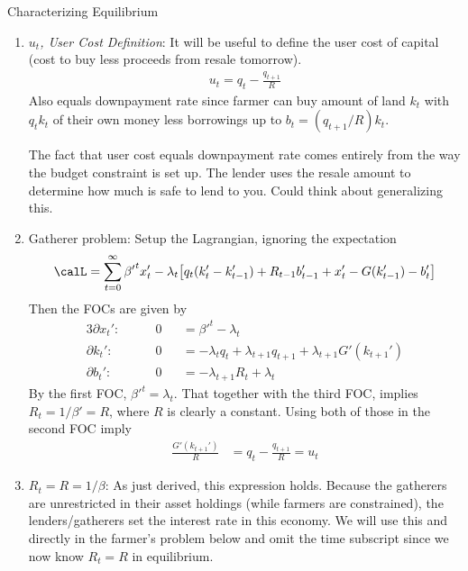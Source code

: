 \documentclass[12pt]{article}
\theoremstyle{plain}
\theoremstyle{definition}
\theoremstyle{remark}
\begin{document}
\clearpage
Characterizing Equilibrium
\begin{enumerate}
  \item
    \emph{$u_t$, User Cost Definition}:
    It will be useful to define the user cost of capital (cost to buy
    less proceeds from resale tomorrow).
    \begin{align*}
      u_t = q_t - \frac{q_{t+1}}{R}
    \end{align*}
     Also equals downpayment rate since farmer can buy amount of land
     $k_{t}$ with $q_{t}k_t$ of their own money less borrowings up to
     $b_t = (q_{t+1}/R)k_t$.

     The fact that user cost equals downpayment rate comes entirely from
     the way the budget constraint is set up.
     The lender uses the resale amount to determine how much is safe to
     lend to you.
     Could think about generalizing this.

  \item
    Gatherer problem: Setup the Lagrangian, ignoring the expectation
    \begin{align*}
      \calL
      =
      \sum_{t=0}^\infty
      {\beta'}^tx_{t}'
      -
      \lambda_t
      \big[
      q_t(k_t'-k_{t-1}')
      + R_{t-1}b_{t-1}'
      + x_t'
      - G(k_{t-1}')
      - b_t'
      \big]
    \end{align*}
    Then the FOCs are given by
    \begin{alignat*}{3}
      \partial x_t':&
      \qquad
      0 &&=
      {\beta'}^t
      - \lambda_t
      \\
      \partial k_t':&
      \qquad
      0 &&=
      -\lambda_tq_t
      + \lambda_{t+1}q_{t+1}
      + \lambda_{t+1}G'(k_{t+1}')
      \\
      \partial b_t':&
      \qquad
      0 &&=
      -\lambda_{t+1}R_t
      + \lambda_t
    \end{alignat*}
    By the first FOC, ${\beta'}^t=\lambda_t$.
    That together with the third FOC, implies $R_t=1/\beta'=R$, where
    $R$ is clearly a constant.
    Using both of those in the second FOC imply
    \begin{align*}
      \frac{G'(k_{t+1}')}{R}
      &=
      q_t
      -\frac{q_{t+1}}{R} = u_t
    \end{align*}

  \item $R_t=R=1/\beta$: As just derived, this expression holds.
    Because the gatherers are unrestricted in their asset holdings
    (while farmers are constrained), the lenders/gatherers set the
    interest rate in this economy.
    We will use this and directly in the farmer's problem below and omit
    the time subscript since we now know $R_t=R$ in equilibrium.


\end{enumerate}
\end{document}

